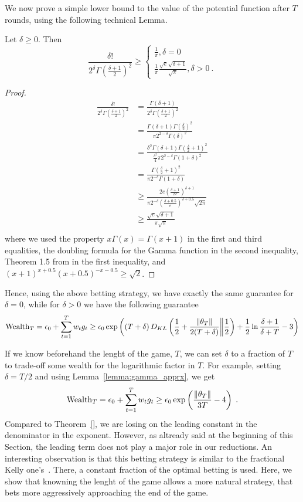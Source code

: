 We now prove a simple lower bound to the value of the potential function after $T$ rounds, using the following technical Lemma.
\begin{lemma}
Let $\delta \geq 0$. Then
\[
\frac{\delta!}{2^\delta \Gamma(\frac{\delta+1}{2})^2} \geq 
\begin{cases}
\frac{1}{\pi}, \delta=0\\
\frac{1}{\pi} \frac{\sqrt{e} \sqrt{\delta+1}}{\sqrt{\pi}}, \delta>0~.
\end{cases}
\]
\end{lemma}
\begin{proof}
\begin{align}
\frac{\delta!}{2^\delta \Gamma(\frac{\delta+1}{2})^2} 
&= \frac{\Gamma(\delta+1)}{2^\delta \Gamma(\frac{\delta+1}{2})^2} \\
&= \frac{\Gamma(\delta+1) \Gamma(\frac{\delta}{2})^2}{\pi 2^{2-\delta} \Gamma(\delta)^2} \\
&= \frac{\delta^2 \Gamma(\delta+1) \Gamma(\frac{\delta}{2}+1)^2}{\frac{\delta^2}{4} \pi 2^{2-\delta} \Gamma(1+\delta)^2} \\
&= \frac{\Gamma(\frac{\delta}{2}+1)^2}{\pi 2^{-\delta} \Gamma(1+\delta)} \\
&\geq \frac{2 e \left(\frac{\delta+1}{2 \, e}\right)^{\delta+1}}{\pi 2^{-\delta} \left(\frac{\delta+0.5}{e}\right)^{\delta+0.5}\sqrt{2 \pi}} \\
&\geq \frac{\sqrt{e} \sqrt{\delta+1}}{\pi \sqrt{\pi}} \\
\end{align}
where we used the property $x \Gamma(x) =\Gamma(x+1)$ in the first and third equalities, the doubling formula for the Gamma function in the second inequality, Theorem 1.5 from \cite{Batir08} in the first inequality, and $(x+1)^{x+0.5} (x+0.5)^{-x-0.5}\geq \sqrt{2}$.
\end{proof}


Hence, using the above betting strategy, we have exactly the same guarantee for $\delta=0$, while for $\delta>0$ we have
the following guarantee
\[
\operatorname{Wealth}_T = \epsilon_0 + \sum_{t=1}^T w_t g_t \geq \epsilon_0 \exp\left( (T+\delta) \, D_{KL}\left(\frac{1}{2}+\frac{\|\theta_T\|}{2(T+\delta)}\middle\|\frac{1}{2}\right) + \frac{1}{2}\ln \frac{\delta+1}{\delta+T} - 3\right) 
\]

If we know beforehand the lenght of the game, $T$, we can set $\delta$ to a fraction of $T$ to trade-off some wealth for the logarithmic factor in $T$. For example, setting $\delta=T/2$ and using Lemma~\ref{lemma:gamma_apprx}, we get
\[
\operatorname{Wealth}_T = \epsilon_0 + \sum_{t=1}^T w_t g_t \geq \epsilon_0 \exp\left( \frac{\|\theta_T\|}{3T} -4\right) \;.
\]
Compared to Theorem~\ref{}, we are losing on the leading constant in the denominator in the exponent. However, as altready said at the beginning of this Section, the leading term does not play a major role in our reductions.
An interesting observation is that this betting strategy is similar to the fractional Kelly one's~\cite{}. There, a constant fraction of the optimal betting is used. Here, we show that knowning the lenght of the game allows a more natural strategy, that bets more aggressively approaching the end of the game.

